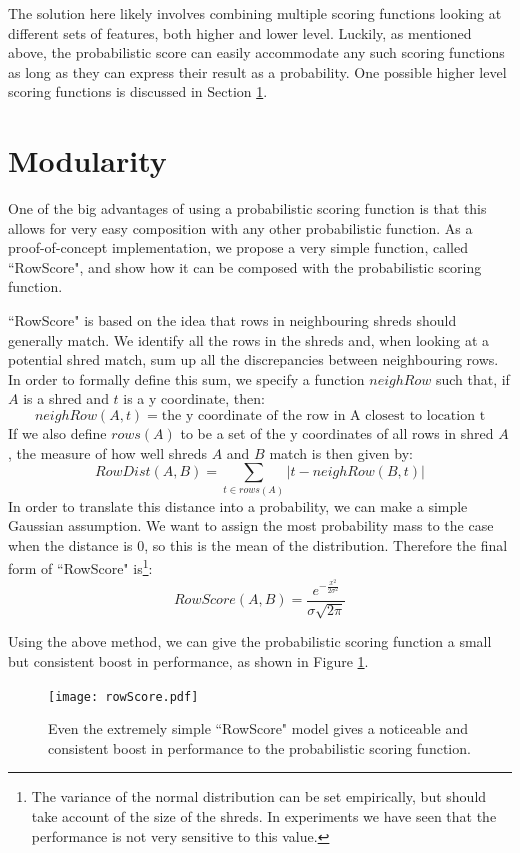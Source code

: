 The solution here likely involves combining multiple scoring functions looking at different sets of features, both higher and lower level. Luckily, as mentioned above, the probabilistic score can easily accommodate any such scoring functions as long as they can express their result as a probability. One possible higher level scoring functions is discussed in Section \ref{chap4Mod}.

\section{Modularity}
\label{chap4Mod}

One of the big advantages of using a probabilistic scoring function is that this allows for very easy composition with any other probabilistic function. As a proof-of-concept implementation, we propose a very simple function, called ``RowScore", and show how it can be composed with the probabilistic scoring function.

``RowScore" is based on the idea that rows in neighbouring shreds should generally match. We identify all the rows in the shreds and, when looking at a potential shred match, sum up all the discrepancies between neighbouring rows. In order to formally define this sum, we specify a function $neighRow$ such that, if $A$ is a shred and $t$ is a y coordinate, then: \[neighRow(A,t) = \mbox{the y coordinate of the row in A closest to location t} \] If we also define $rows(A)$ to be a set of the y coordinates of all rows in shred $A$, the measure of how well shreds $A$ and $B$ match is then given by: \[RowDist(A,B) = \sum_{t \in rows(A)} |t - neighRow(B,t)| \] In order to translate this distance into a probability, we can make a simple Gaussian assumption. We want to assign the most probability mass to the case when the distance is $0$, so this is the mean of the distribution. Therefore the final form of ``RowScore" is\footnote{The variance of the normal distribution can be set empirically, but should take account of the size of the shreds. In experiments we have seen that the performance is not very sensitive to this value.}: \[ RowScore(A,B) = \frac{\displaystyle {e}^{-\frac{x^2}{2\sigma^2}}}{\sigma \sqrt{2\pi}} \]

Using the above method, we can give the probabilistic scoring function a small but consistent boost in performance, as shown in Figure \ref{fig:rowScore}.
\begin{figure}[h]
\centering
\texttt{[image: rowScore.pdf]}
\caption{Even the extremely simple ``RowScore" model gives a noticeable and consistent boost in performance to the probabilistic scoring function.}
\label{fig:rowScore}
\end{figure}
